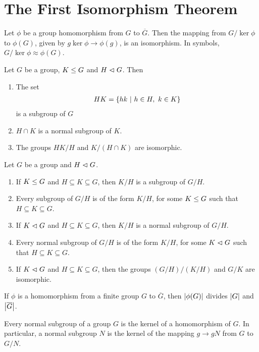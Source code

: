 \section{The First Isomorphism Theorem}

\begin{theorem}
	Let $\phi$ be a group homomorphism from $G$ to $\overline{G}$. Then the mapping from $G/\ker\phi$ to $\phi(G)$, given by $g\ker\phi \to \phi(g)$, is an isomorphism. In symbols, $G/\ker\phi \approx \phi(G)$.
\end{theorem}

\begin{theorem}
    Let \(G\) be a group, \(K\leq G\) and \(H\vartriangleleft G\). Then
    \begin{enumerate}[label=(\alph*)]
        \item The set \vspace{-1em}
        \begin{align*}
            HK = \{hk \st h\in H,\ k\in K\}\vspace{-1em}
        \end{align*}
        is a subgroup of \(G\)
        \item \(H\cap K\) is a normal subgroup of \(K\).
        \item The groups \(HK / H\) and \(K / (H\cap K)\) are isomorphic.
    \end{enumerate}
\end{theorem}

\begin{theorem}
    Let \(G\) be a group and \(H \vartriangleleft G\).
    \begin{enumerate}[label=(\alph*)]
        \item If \(K\leq G\) and \(H \subseteq K\subseteq G\), then \(K / H\) is a subgroup of \(G / H\).
        \item Every subgroup of \(G / H\) is of the form \(K / H\), for some \(K\leq G\) such that \(H \subseteq K\subseteq G\).
        \item If \(K\vartriangleleft G\) and \(H \subseteq K\subseteq G\), then \(K / H\) is a normal subgroup of \(G / H\).
        \item Every normal subgroup of \(G / H\) is of the form \(K / H\), for some \(K\vartriangleleft G\) such that \(H \subseteq K\subseteq G\).
        \item If \(K\vartriangleleft G\) and \(H \subseteq K\subseteq G\), then the groups \((G/H)/(K/H)\) and \(G/K\) are isomorphic.
    \end{enumerate}
\end{theorem}

\begin{corollary}
	If $\phi$ is a homomorphism from a finite group $G$ to $\overline{G}$, then $\left\lvert \phi(G) \right\rvert$ divides $\left\lvert G \right\rvert$ and $\left\lvert \overline{G} \right\rvert$.
\end{corollary}

\begin{theorem}
	Every normal subgroup of a group $G$ is the kernel of a homomorphism of $G$. In particular, a normal subgroup $N$ is the kernel of the mapping $g \to gN$ from $G$ to $G/N$.
\end{theorem}

